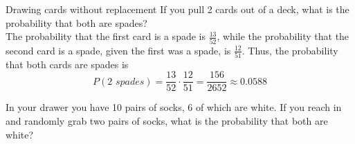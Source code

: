 \begin{example}[https://www.youtube.com/watch?v=6CvJ2GJ6HHU]{Drawing cards without replacement}
If you pull 2 cards out of a deck, what is the probability that both are spades? \\

 The probability that the first card is a spade is $\frac{13}{52}$, while the probability that the second card is a spade, given the first was a spade, is $\frac{12}{51}$. Thus, the probability that both cards are spades is
\[  P( \mbox{2 } spades ) = \frac{13}{52} \cdot \frac{12}{51} = \frac{156}{2652} \approx 0.0588 \]
\end{example}

\begin{try}
In your drawer you have 10 pairs of socks, 6 of which are white. If you reach in and
randomly grab two pairs of socks, what is the probability that both are white?
\end{try}

